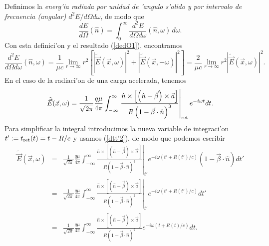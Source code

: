 Definimos la\textit{ energ'ia radiada por unidad de 'angulo s'olido y por intervalo de frecuencia (angular)} ${d^2E}/{d\Omega d\omega}$, de modo que
\begin{equation}
\frac{dE}{d\Omega}(\hat{n})=\int_0^{\infty}\frac{d^2E}{d\Omega d\omega}(\hat{n},\omega)\,d\omega .
\end{equation}
Con esta definici'on y el resultado (\ref{dedO1}), encontramos
\begin{equation}
\frac{d^2E}{d\Omega d\omega}(\hat{n},\omega)=\frac{1}{\mu c}\lim_{r\to\infty}r^2\left[\left|\tilde{\vec{E}}(\vec{x},\omega)\right|^2 +\left|\tilde{\vec{E}}(\vec{x},-\omega)\right|^2\right]
=\frac{2}{\mu c}\lim_{r\to\infty}r^2\left|\tilde{\vec{E}}(\vec{x},\omega)\right|^2.
\end{equation}
En el caso de la radiaci'on de una carga acelerada, tenemos
\begin{equation}
\tilde{\vec{E}}(\vec{x},\omega)= \frac{1}{\sqrt{2\pi}}\frac{q\mu}{4\pi}\int_{-\infty}^{\infty
}\left.\frac{\hat{n}\times\left[ \left( \hat{n}-\vec{\beta}\right)
\times{\vec{a}}\right] }{R\left( 1-\vec{\beta}\cdot\hat{n}\right)
^3}\right|_{\rm ret}e^{-i\omega t}dt .
\end{equation}
Para simplificar la integral introducimos la nueva variable de integraci'on
$t':=t_{\rm ret}(t)=t-{R}/{c}$ y usamos (\ref{dtt'2}), de modo que podemos escribir
\begin{eqnarray}
\tilde{\vec{E}}(\vec{x},\omega)&=&\frac{1}{\sqrt{2\pi}}\frac{q\mu}{4\pi}\int_{-\infty}^{\infty
}\left.\frac{\hat{n}\times\left[ \left( \hat{n}-\vec{\beta}\right)
\times{\vec{a}}\right] }{R\left( 1-\vec{\beta}\cdot\hat{n}\right)
^3}\right|_{t'}e^{-i\omega (t'+R(t')/c)}\left(
1-\vec{\beta}\cdot\hat{n}\right) dt' \\
&=&\frac{1}{\sqrt{2\pi}}\frac{q\mu}{4\pi}\int_{-\infty}^{\infty
}\left.\frac{\hat{n}\times\left[ \left( \hat{n}-\vec{\beta}\right)
\times{\vec{a}}\right] }{R\left(1-\vec{\beta}\cdot\hat{n}\right)^2}
\right|_{t'}e^{-i\omega (t'+R(t')/c)} dt' \\
&=&\frac{1}{\sqrt{2\pi}}\frac{q\mu}{4\pi}\int_{-\infty}^{\infty
}\frac{\hat{n}\times\left[ \left( \hat{n}-\vec{\beta}\right)
\times{\vec{a}}\right] }{R\left( 1-\vec{\beta}\cdot\hat{n}\right)^2}
e^{-i\omega (t+R(t)/c)} dt.
\end{eqnarray}
